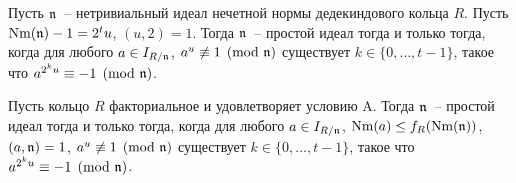 \documentclass[_00_dissertation.tex]{subfiles}
\begin{document}
\begin{theorem}\label{theorem:miller_criteria}
    Пусть $\mathfrak{n}$~-- нетривиальный идеал нечетной нормы дедекиндового кольца $R$.
    Пусть $\textrm{Nm}(\mathfrak{n}) - 1 = 2^t u$, $(u, 2) = 1$.
    Тогда $\mathfrak{n}$~-- простой идеал тогда и только тогда, когда для любого $a \in I_{R/\mathfrak{n}}$, $a^u \not\equiv 1 \pmod{\mathfrak{n}}$ существует $k\in \{0, \dots, t-1\}$, такое что $a^{2^{k}u} \equiv -1 \pmod{\mathfrak{n}}$.

    Пусть кольцо $R$ факториальное и удовлетворяет условию A.
    Тогда $\mathfrak{n}$~-- простой идеал тогда и только тогда, когда для любого $a \in I_{R/\mathfrak{n}}$, $\textrm{Nm}(a) \le f_R(\textrm{Nm}(\mathfrak{n}))$, $(a, \mathfrak{n}) = 1$, $a^u \not\equiv 1 \pmod{\mathfrak{n}}$ существует $k\in \{0, \dots, t-1\}$, такое что $a^{2^{k}u} \equiv -1 \pmod{\mathfrak{n}}$.
\end{theorem}
\end{document}
